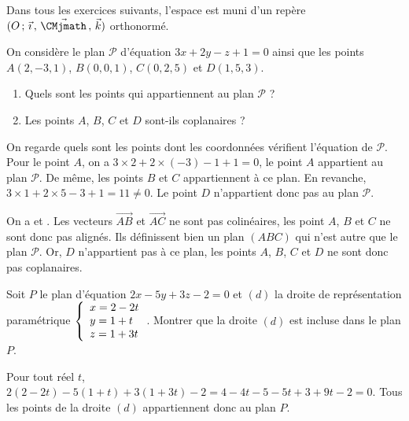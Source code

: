 \documentclass[11pt,fleqn, openany]{book} %
\begin{document}
Dans tous les exercices suivants, l'espace est muni d'un repère $\Oijk$ orthonormé.

\begin{exercise}On considère le plan $\mathcal{P}$ d'équation $3x+2y-z+1=0$ ainsi que les points $A(2,-3,1)$, $B(0,0,1)$, $C(0,2,5)$ et $D(1,5,3)$.
\begin{enumerate}
\item Quels sont les points qui appartiennent au plan $\mathcal{P}$ ?
\item Les points $A$, $B$, $C$ et $D$ sont-ils coplanaires ?
\end{enumerate}\end{exercise}

\begin{solution}On regarde quels sont les points dont les coordonnées vérifient l'équation de $\mathcal{P}$. Pour le point $A$, on a $3 \times 2 +2 \times(-3)-1+1=0$, le point $A$ appartient au plan $\mathcal{P}$. De même, les points $B$ et $C$ appartiennent à ce plan. En revanche, $3 \times 1 +2 \times 5-3+1=11 \neq 0$. Le point $D$ n'appartient donc pas au plan $\mathcal{P}$.

On a  et . Les vecteurs $\overrightarrow{AB}$ et $ \overrightarrow{AC}$ ne sont pas colinéaires, les point $A$, $B$ et $C$ ne sont donc pas alignés. Ils définissent bien un plan $(ABC)$ qui n'est autre que le plan $\mathcal{P}$. Or, $D$ n'appartient pas à ce plan, les points $A$, $B$, $C$ et $D$ ne sont donc pas coplanaires.
\end{solution}



\begin{exercise}Soit $P$ le plan d'équation $2x-5y+3z-2=0$ et $(d)$ la droite de représentation paramétrique $\left\{\renewcommand{\arraystretch}{1}\renewcommand{\arraystretch}{1}\begin{array}{l}x=2-2t \\ y=1+t \\z=1+3t\end{array}\right.$. Montrer que la droite $(d)$ est incluse dans le plan $P$.\end{exercise}

\begin{solution}Pour tout réel $t$, $2(2-2t)-5(1+t)+3(1+3t)-2=4-4t-5-5t+3+9t-2=0$. Tous les points de la droite $(d)$ appartiennent donc au plan $P$.\end{solution}
\end{document}
